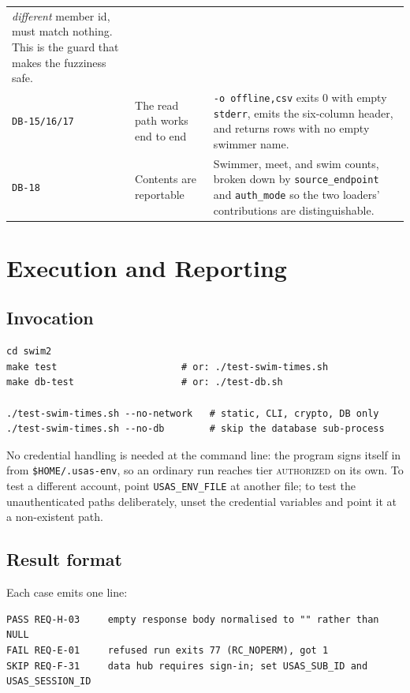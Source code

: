 \documentclass[12pt]{article}
\newcommand{\code}[1]{\texttt{#1}}
\newcommand{\req}[1]{\texttt{#1}}
\begin{document}
\begin{center}
\begin{longtable}{p{2.1cm}p{5.2cm}p{6.2cm}}
      \emph{different} member id, must match nothing.  This is the
      guard that makes the fuzziness safe. \\
  \req{DB-15/16/17} & The read path works end to end
    & \code{-o offline,csv} exits 0 with empty \code{stderr}, emits the
      six-column header, and returns rows with no empty swimmer
      name. \\
  \req{DB-18} & Contents are reportable
    & Swimmer, meet, and swim counts, broken down by
      \code{source\_endpoint} and \code{auth\_mode} so the two loaders'
      contributions are distinguishable. \\
  \bottomrule
\end{longtable}
\end{center}

\section{Execution and Reporting}

\subsection{Invocation}

\begin{lstlisting}
cd swim2
make test                      # or: ./test-swim-times.sh
make db-test                   # or: ./test-db.sh

./test-swim-times.sh --no-network   # static, CLI, crypto, DB only
./test-swim-times.sh --no-db        # skip the database sub-process
\end{lstlisting}

\noindent No credential handling is needed at the command line: the
program signs itself in from \code{\$HOME/.usas-env}, so an ordinary
run reaches tier \textsc{authorized} on its own.  To test a different
account, point \code{USAS\_ENV\_FILE} at another file; to test the
unauthenticated paths deliberately, unset the credential variables and
point it at a non-existent path.

\subsection{Result format}

Each case emits one line:

\begin{lstlisting}
PASS REQ-H-03     empty response body normalised to "" rather than NULL
FAIL REQ-E-01     refused run exits 77 (RC_NOPERM), got 1
SKIP REQ-F-31     data hub requires sign-in; set USAS_SUB_ID and USAS_SESSION_ID
\end{lstlisting}
\end{document}
